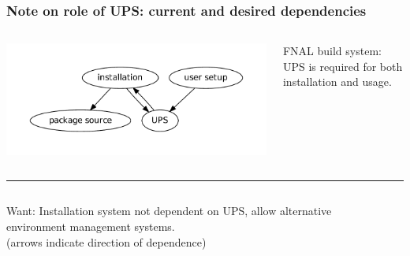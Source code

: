 \documentclass[xcolor=dvipsnames]{beamer}
\begin{document}
\begin{frame}
  \frametitle{Note on role of UPS: current and desired dependencies}
  \begin{columns}
    \begin{column}{0.6\paperwidth}
      \includegraphics[width=\textwidth]{ups-deps}
    \end{column}
    \begin{column}{0.4\paperwidth}
      FNAL build system: UPS is required for both installation and
      usage.
    \end{column}
  \end{columns}
  \vspace{-5mm}
  \hrule
  \vspace{-5mm}
  \begin{columns}
    \begin{column}{0.5\paperwidth}
      Want: Installation system not dependent on UPS, allow
      alternative environment management systems. \\
      \vspace{1cm}
      {\footnotesize (arrows indicate direction of dependence)}
    \end{column}
    \begin{column}{0.4\paperwidth}

\end{column}
\end{columns}
\end{frame}
\end{document}

